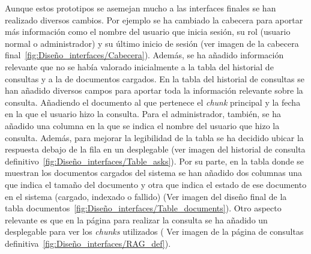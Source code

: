 
Aunque estos prototipos se asemejan mucho a las interfaces finales se han realizado diversos cambios. Por ejemplo se ha cambiado la cabecera para aportar más información como el nombre del usuario que inicia sesión, su rol (usuario normal o administrador) y su último inicio de sesión (ver imagen de la cabecera final~\ref{fig:Diseño_interfaces/Cabecera}). Además, se ha añadido información relevante que no se había valorado inicialmente a la tabla del historial de consultas y a la de documentos cargados. En la tabla del historial de consultas se han añadido diversos campos para aportar toda la información relevante sobre la consulta. Añadiendo el documento al que pertenece el \textit{chunk} principal y la fecha en la que el usuario hizo la consulta. Para el administrador, también, se ha añadido una columna en la que se indica el nombre del usuario que hizo la consulta. Además, para mejorar la legibilidad de la tabla se ha decidido ubicar la respuesta debajo de la fila en un desplegable (ver imagen del historial de consulta definitivo~\ref{fig:Diseño_interfaces/Table_asks}). Por su parte, en la tabla donde se muestran los documentos cargados del sistema se han añadido dos columnas una que indica el tamaño del documento y otra que indica el estado de ese documento en el sistema (cargado, indexado o fallido) (Ver imagen del diseño final de la tabla documentos~\ref{fig:Diseño_interfaces/Table_documents}). Otro aspecto relevante es que en la página para realizar la consulta se ha añadido un desplegable para ver los \textit{chunks} utilizados ( Ver imagen de la página de consultas definitiva~\ref{fig:Diseño_interfaces/RAG_def}).

